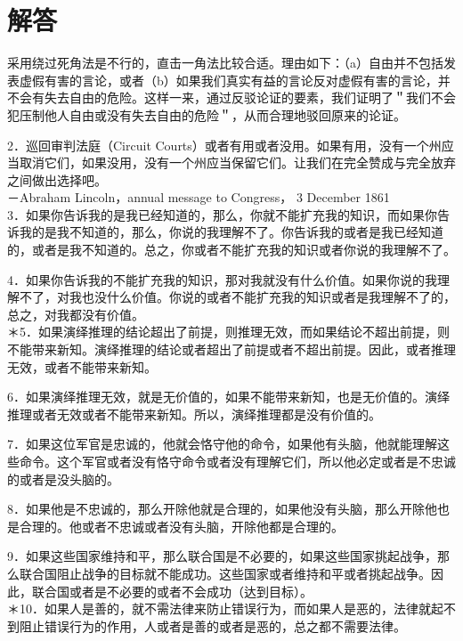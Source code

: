 \section*{解答}
采用绕过死角法是不行的，直击一角法比较合适。理由如下：（a）自由并不包括发表虚假有害的言论，或者（b）如果我们真实有益的言论反对虚假有害的言论，并不会有失去自由的危险。这样一来，通过反驳论证的要素，我们证明了＂我们不会犯压制他人自由或没有失去自由的危险＂，从而合理地驳回原来的论证。

2．巡回审判法庭（Circuit Courts）或者有用或者没用。如果有用，没有一个州应当取消它们，如果没用，没有一个州应当保留它们。让我们在完全赞成与完全放弃之间做出选择吧。\\
－Abraham Lincoln，annual message to Congress， 3 December 1861\\
3．如果你告诉我的是我已经知道的，那么，你就不能扩充我的知识，而如果你告诉我的是我不知道的，那么，你说的我理解不了。你告诉我的或者是我已经知道的，或者是我不知道的。总之，你或者不能扩充我的知识或者你说的我理解不了。

4．如果你告诉我的不能扩充我的知识，那对我就没有什么价值。如果你说的我理解不了，对我也没什么价值。你说的或者不能扩充我的知识或者是我理解不了的，总之，对我都没有价值。\\
＊5．如果演绎推理的结论超出了前提，则推理无效，而如果结论不超出前提，则不能带来新知。演绎推理的结论或者超出了前提或者不超出前提。因此，或者推理无效，或者不能带来新知。

6．如果演绎推理无效，就是无价值的，如果不能带来新知，也是无价值的。演绎推理或者无效或者不能带来新知。所以，演绎推理都是没有价值的。

7．如果这位军官是忠诚的，他就会恪守他的命令，如果他有头脑，他就能理解这些命令。这个军官或者没有恪守命令或者没有理解它们，所以他必定或者是不忠诚的或者是没头脑的。

8．如果他是不忠诚的，那么开除他就是合理的，如果他没有头脑，那么开除他也是合理的。他或者不忠诚或者没有头脑，开除他都是合理的。

9．如果这些国家维持和平，那么联合国是不必要的，如果这些国家挑起战争，那么联合国阻止战争的目标就不能成功。这些国家或者维持和平或者挑起战争。因此，联合国或者是不必要的或者不会成功（达到目标）。\\
＊10．如果人是善的，就不需法律来防止错误行为，而如果人是恶的，法律就起不到阻止错误行为的作用，人或者是善的或者是恶的，总之都不需要法律。

